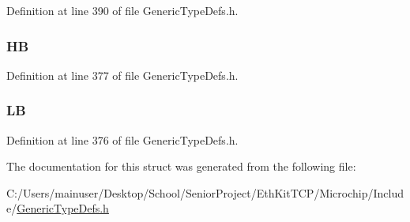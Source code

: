 Definition at line 390 of file Generic\+Type\+Defs.\+h.

\hypertarget{struct_w_o_r_d___v_a_l_1_1_____p_a_c_k_e_d_a5a27b50a15cb01af9899b59caa13ec00}{}
\subsubsection[{H\+B}]{ H\+B}\label{struct_w_o_r_d___v_a_l_1_1_____p_a_c_k_e_d_a5a27b50a15cb01af9899b59caa13ec00}


Definition at line 377 of file Generic\+Type\+Defs.\+h.

\hypertarget{struct_w_o_r_d___v_a_l_1_1_____p_a_c_k_e_d_a623052b197820c89704b02311fdca816}{}
\subsubsection[{L\+B}]{ L\+B}\label{struct_w_o_r_d___v_a_l_1_1_____p_a_c_k_e_d_a623052b197820c89704b02311fdca816}


Definition at line 376 of file Generic\+Type\+Defs.\+h.



The documentation for this struct was generated from the following file\+:\begin{DoxyCompactItemize}
\item 
C\+:/\+Users/mainuser/\+Desktop/\+School/\+Senior\+Project/\+Eth\+Kit\+T\+C\+P/\+Microchip/\+Include/\hyperlink{_generic_type_defs_8h}{Generic\+Type\+Defs.\+h}\end{DoxyCompactItemize}
